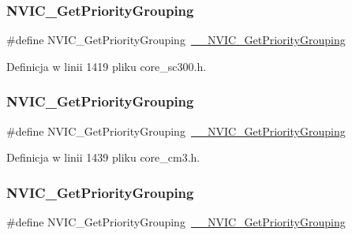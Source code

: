 \subsubsection{\texorpdfstring{N\+V\+I\+C\+\_\+\+Get\+Priority\+Grouping}{NVIC\_GetPriorityGrouping}\hspace{0.1cm}{\footnotesize\ttfamily [5/10]}}
{\footnotesize\ttfamily \#define N\+V\+I\+C\+\_\+\+Get\+Priority\+Grouping~\hyperlink{group___c_m_s_i_s___core___n_v_i_c_functions_ga9b894af672df4373eb637f8288845c05}{\+\_\+\+\_\+\+N\+V\+I\+C\+\_\+\+Get\+Priority\+Grouping}}



Definicja w linii 1419 pliku core\+\_\+sc300.\+h.

\mbox{\label{group___c_m_s_i_s___core___n_v_i_c_functions_ga4eeb9214f2264fc23c34ad5de2d3fa11}} 
\subsubsection{\texorpdfstring{N\+V\+I\+C\+\_\+\+Get\+Priority\+Grouping}{NVIC\_GetPriorityGrouping}\hspace{0.1cm}{\footnotesize\ttfamily [6/10]}}
{\footnotesize\ttfamily \#define N\+V\+I\+C\+\_\+\+Get\+Priority\+Grouping~\hyperlink{group___c_m_s_i_s___core___n_v_i_c_functions_ga9b894af672df4373eb637f8288845c05}{\+\_\+\+\_\+\+N\+V\+I\+C\+\_\+\+Get\+Priority\+Grouping}}



Definicja w linii 1439 pliku core\+\_\+cm3.\+h.

\mbox{\label{group___c_m_s_i_s___core___n_v_i_c_functions_ga4eeb9214f2264fc23c34ad5de2d3fa11}} 
\subsubsection{\texorpdfstring{N\+V\+I\+C\+\_\+\+Get\+Priority\+Grouping}{NVIC\_GetPriorityGrouping}\hspace{0.1cm}{\footnotesize\ttfamily [7/10]}}
{\footnotesize\ttfamily \#define N\+V\+I\+C\+\_\+\+Get\+Priority\+Grouping~\hyperlink{group___c_m_s_i_s___core___n_v_i_c_functions_ga9b894af672df4373eb637f8288845c05}{\+\_\+\+\_\+\+N\+V\+I\+C\+\_\+\+Get\+Priority\+Grouping}}



